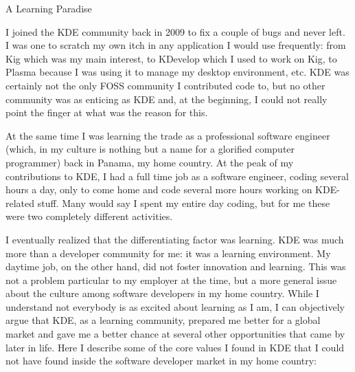 A Learning Paradise

\par
I joined the KDE community back in 2009 to fix a couple of bugs and
never left. I was one to scratch my own itch in any application I
would use frequently: from Kig which was my main interest, to KDevelop
which I used to work on Kig, to Plasma because I was using it to
manage my desktop environment, etc. KDE was certainly not the only
FOSS community I contributed code to, but no other community was as
enticing as KDE and, at the beginning, I could not really point the
finger at what was the reason for this.
\par
At the same time I was learning the trade as a professional software
engineer (which, in my culture is nothing but a name for a glorified
computer programmer) back in Panama, my home country. At the peak of
my contributions to KDE, I had a full time job as a software engineer,
coding several hours a day, only to come home and code several more
hours working on KDE-related stuff. Many would say I spent my entire
day coding, but for me these were two completely different activities.
\par
I eventually realized that the differentiating factor was
learning. KDE was much more than a developer community for me: it was
a learning environment. My daytime job, on the other hand, did not
foster innovation and learning. This was not a problem particular to
my employer at the time, but a more general issue about the culture
among software developers in my home country. While I understand not
everybody is as excited about learning as I am, I can objectively
argue that KDE, as a learning community, prepared me better for a
global market and gave me a better chance at several other
opportunities that came by later in life. Here I describe some of the
core values I found in KDE that I could not have found inside the
software developer market in my home country:

